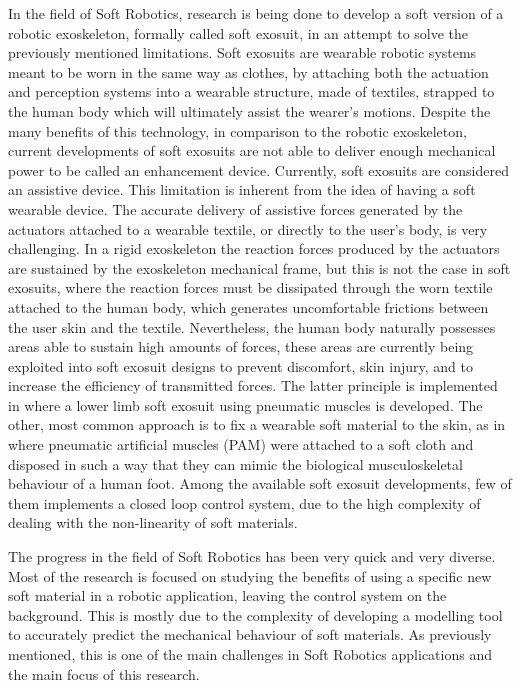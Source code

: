 In the field of Soft Robotics, research is being done to develop a soft version of a robotic exoskeleton, formally called soft exosuit, in an attempt to solve the previously mentioned limitations. Soft exosuits are wearable robotic systems meant to be worn in the same way as clothes, by attaching both the actuation and perception systems into a wearable structure, made of textiles, strapped to the human body which will ultimately assist the wearer's motions. Despite the many benefits of this technology, in comparison to the robotic exoskeleton, current developments of soft exosuits are not able to deliver enough mechanical power to be called an enhancement device. Currently, soft exosuits are considered an assistive device. This limitation is inherent from the idea of having a soft wearable device. The accurate delivery of assistive forces generated by the actuators attached to a wearable textile, or directly to the user's body, is very challenging. In a rigid exoskeleton the reaction forces produced by the actuators are sustained by the exoskeleton mechanical frame, but this is not the case in soft exosuits, where the reaction forces must be dissipated through the worn textile attached to the human body, which generates uncomfortable frictions between the user skin and the textile. Nevertheless, the human body naturally possesses areas able to sustain high amounts of forces, these areas are currently being exploited into soft exosuit designs to prevent discomfort, skin injury, and to increase the efficiency of transmitted forces. The latter principle is implemented in \cite{wehner2013lightweight} where a lower limb soft exosuit using pneumatic muscles is developed. The other, most common approach is to fix a wearable soft material to the skin, as in \cite{park2014design,park2011bio} where pneumatic artificial muscles (PAM) were attached to a soft cloth and disposed in such a way that they can mimic the biological musculoskeletal behaviour of a human foot. Among the available soft exosuit developments, few of them implements a closed loop control system, due to the high complexity of dealing with the non-linearity of soft materials. 

The progress in the field of Soft Robotics has been very quick and very diverse. Most of the research is focused on studying the benefits of using a specific new soft material in a robotic application, leaving the control system on the background. This is mostly due to the complexity of developing a modelling tool to accurately predict the mechanical behaviour of soft materials. As previously mentioned, this is one of the main challenges in Soft Robotics applications and the main focus of this research.

